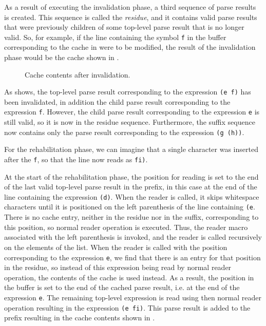 As a result of executing the invalidation phase, a third sequence of
parse results is created.  This sequence is called the \emph{residue},
and it contains valid parse results that were previously children of
some top-level parse result that is no longer valid.  So, for example,
if the line containing the symbol \texttt{f} in the buffer
corresponding to the cache in  were to be modified,
the result of the invalidation phase would be the cache shown in
.

\begin{figure}
\begin{center}
\end{center}
\caption{\label{fig-after-invalidation}
Cache contents after invalidation.}
\end{figure}

As  shows, the top-level parse result
corresponding to the expression \texttt{(e f)} has been invalidated,
in addition the child parse result corresponding to the expression
\texttt{f}.  However, the child parse result corresponding to the
expression \texttt{e} is still valid, so it is now in the residue
sequence.  Furthermore, the suffix sequence now contains only the
parse result corresponding to the expression \texttt{(g (h))}.

For the rehabilitation phase, we can imagine that a single character
was inserted after the \texttt{f}, so that the line now reads as
\texttt{fi)}.

At the start of the rehabilitation phase, the position for reading is
set to the end of the last valid top-level parse result in the prefix,
in this case at the end of the line containing the expression
\texttt{(d)}.  When the reader is called, it skips whitespace
characters until it is positioned on the left parenthesis of the line
containing \texttt{(e}.  There is no cache entry, neither in the
residue nor in the suffix, corresponding to this position, so normal
reader operation is executed.  Thus, the reader macro associated with
the left parenthesis is invoked, and the reader is called recursively
on the elements of the list.  When the reader is called with the
position corresponding to the expression \texttt{e}, we find that
there is an entry for that position in the residue, so instead of this
expression being read by normal reader operation, the contents of the
cache is used instead.  As a result, the position in the buffer is set
to the end of the cached parse result, i.e. at the end of the
expression \texttt{e}.  The remaining top-level expression is read
using then normal reader operation resulting in the expression \texttt{(e
  fi)}.  This parse result is added to the prefix resulting in the
cache contents shown in .

